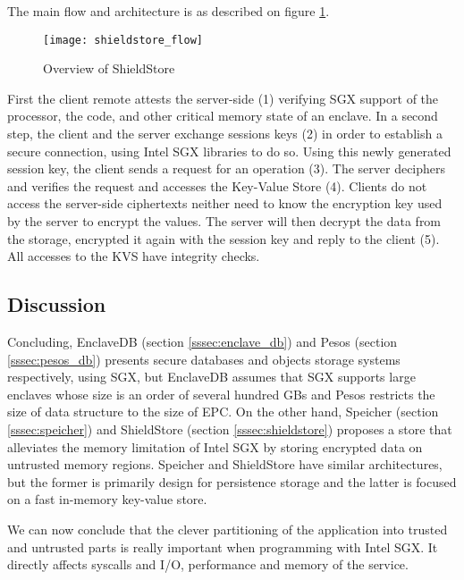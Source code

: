 The main flow and architecture is as described on figure \ref{fig:shieldstore_overview}.

\begin{figure}[htbp]
	\centering
	{\texttt{[image: shieldstore\_flow]}}%
	\caption{Overview of ShieldStore}
	\label{fig:shieldstore_overview}
\end{figure}

First the client remote attests the server-side (1) verifying \gls{SGX} support of the processor, the code, and other critical memory state of an enclave. In a second step, the client and the server exchange sessions keys (2) in order to establish a secure connection, using Intel \gls{SGX} libraries to do so. Using this newly generated session key, the client sends a request for an operation (3). The server deciphers and verifies the request and accesses the Key-Value Store (4). Clients do not access the server-side ciphertexts neither need to know the encryption key used by the server to encrypt the values. The server will then decrypt the data from the storage, encrypted it again with the session key and reply to the client (5). All accesses to the \gls{KVS} have integrity checks.

\subsection{Discussion}
\label{ssec:s3_discussion}

Concluding, EnclaveDB (section \ref{sssec:enclave_db}) and Pesos (section \ref{sssec:pesos_db}) presents secure databases and objects storage systems respectively, using \gls{SGX}, but EnclaveDB assumes that \gls{SGX} supports large enclaves whose size is an order of several hundred \glspl{GB} and Pesos restricts the size of data structure to the size of \gls{EPC}. On the other hand, Speicher (section \ref{sssec:speicher}) and ShieldStore (section \ref{sssec:shieldstore}) proposes a store that alleviates the memory limitation of Intel \gls{SGX} by storing encrypted data on untrusted memory regions. Speicher and ShieldStore have similar architectures, but the former is primarily design for persistence storage and the latter is focused on a fast in-memory key-value store.

We can now conclude that the clever partitioning of the application into trusted and untrusted parts is really important when programming with Intel \gls{SGX}. It directly affects \glspl{syscall} and \gls{I/O}, performance and memory of the service. 

